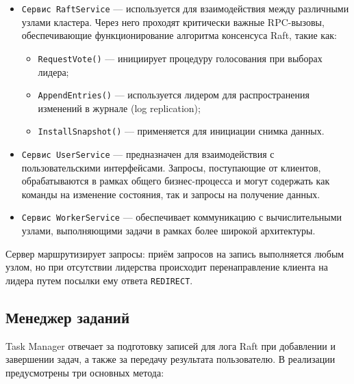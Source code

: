 \begin{itemize}
    \item \texttt{Сервис RaftService} — используется для взаимодействия между
        различными узлами кластера. Через него проходят критически важные
        RPC-вызовы, обеспечивающие функционирование алгоритма консенсуса Raft,
        такие как:
    \begin{itemize}
        \item \texttt{RequestVote()} — инициирует процедуру голосования при
            выборах лидера;
        \item \texttt{AppendEntries()} — используется лидером для
            распространения изменений в журнале (log replication);
        \item \texttt{InstallSnapshot()} — применяется для инициации снимка данных.
    \end{itemize}

    \item \texttt{Сервис UserService} — предназначен для взаимодействия с
        пользовательскими интерфейсами. Запросы, поступающие от клиентов,
        обрабатываются в рамках общего бизнес-процесса и могут содержать как
        команды на изменение состояния, так и запросы на получение данных.

    \item \texttt{Сервис WorkerService} — обеспечивает коммуникацию с
        вычислительными узлами, выполняющими задачи в рамках более широкой
        архитектуры.
\end{itemize}

Сервер маршрутизирует запросы: приём запросов на запись выполняется любым
узлом, но при отсутствии лидерства происходит перенаправление клиента на лидера
путем посылки ему ответа \texttt{REDIRECT}.

\subsection{Менеджер заданий}

Task Manager отвечает за подготовку записей для лога Raft при добавлении и
завершении задач, а также за передачу результата пользователю. В реализации
предусмотрены три основных метода:

